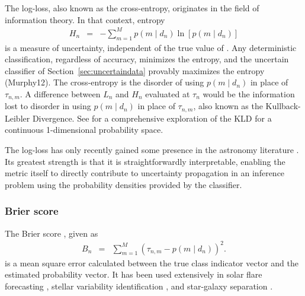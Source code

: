 The log-loss, also known as the cross-entropy, originates in the field of information theory.
In that context, entropy
\begin{eqnarray}
  \label{eq:entropy}
  H_{n} &=& -\sum_{m=1}^{M}p(m \mid d_{n})\ln[p(m \mid d_{n})]
\end{eqnarray}
is a measure of uncertainty, independent of the true value of .
Any deterministic classification, regardless of accuracy, minimizes the entropy, and the uncertain classifier of Section~\ref{sec:uncertaindata} provably maximizes the entropy (Murphy12).
The cross-entropy
is the disorder of using $p(m \mid d_{n})$ in place of $\tau_{n, m}$.
A difference between $L_{n}$ and $H_{n}$ evaluated at $\tau_{n}$ would be the information lost to disorder in using $p(m \mid d_{n})$ in place of $\tau_{n, m}$, also known as the Kullback-Leibler Divergence.
See \cite{2018AJ....156...35M} for a comprehensive exploration of the KLD for a continuous 1-dimensional probability space.

The log-loss has only recently gained some presence in the astronomy literature \citep{hon_deep_2017, hon_deep_2018}.
Its greatest strength is that it is straightforwardly interpretable, enabling the metric itself to directly contribute to uncertainty propagation in an inference problem using the probability densities provided by the classifier.

\subsubsection{Brier score}
\label{sec:brier}

The Brier score \cite{brier_verification_1950}, given as
\begin{eqnarray}
  \label{eq:brier}
B_{n} &=& \sum_{m=1}^{M}(\tau_{n, m}-p(m \mid d_{n}))^{2}.
\end{eqnarray}
is a mean square error calculated between the true class indicator vector and the estimated probability vector.
It has been used extensively in solar flare forecasting \cite{crown_validation, mays_ensemble_2015, florios_forecasting_2018}, stellar variability identification \citep{richards_construction_2012, armstrong_k2_2016}, and star-galaxy separation \citep{kim_hybrid_2015}.

